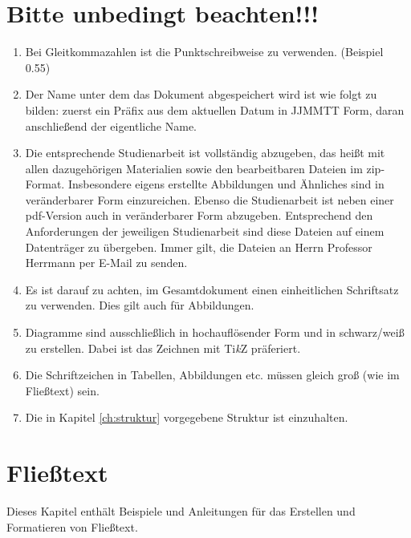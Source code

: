 		\section{Bitte unbedingt beachten!!!}
        \begin{enumerate}
            \item Bei Gleitkommazahlen ist die Punktschreibweise zu verwenden. (Beispiel 0.55)
            \item Der Name unter dem das Dokument abgespeichert wird ist wie folgt zu bilden: zuerst ein Präfix aus dem aktuellen Datum in JJMMTT Form, daran anschließend der eigentliche Name.
            \item Die entsprechende Studienarbeit ist vollständig abzugeben, das heißt mit allen dazugehörigen Materialien sowie den bearbeitbaren Dateien im zip-Format. Insbesondere eigens erstellte Abbildungen und Ähnliches sind in veränderbarer Form einzureichen. Ebenso die Studienarbeit ist neben einer pdf-Version auch in veränderbarer Form abzugeben.  Entsprechend den Anforderungen der jeweiligen Studienarbeit sind diese Dateien auf einem Datenträger zu übergeben. Immer gilt, die Dateien an Herrn Professor Herrmann per E-Mail zu senden.
            \item Es ist darauf zu achten, im Gesamtdokument einen einheitlichen Schriftsatz zu verwenden. Dies gilt auch für Abbildungen.
            \item Diagramme sind ausschließlich in hochauflösender Form und in schwarz/weiß zu erstellen. Dabei ist das Zeichnen mit Ti\textit{k}Z präferiert.
            \item Die Schriftzeichen in Tabellen, Abbildungen etc. müssen gleich groß (wie im Fließtext) sein.
            \item Die in Kapitel \ref{ch:struktur} vorgegebene Struktur ist einzuhalten.               
        \end{enumerate}

		\pagebreak

		\section{Flie{\ss}text}
		\label{ch:fliesstext}
		Dieses Kapitel enthält Beispiele und Anleitungen für das Erstellen und Formatieren von Fließtext.

